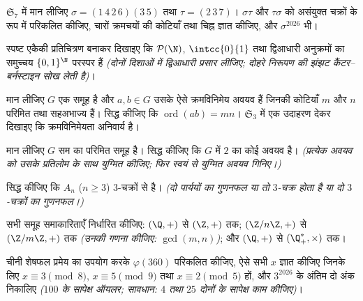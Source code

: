 \begin{exercise}[$\star$]\label{exo:b2:structures:2}
$\mathfrak{S}_7$ में मान लीजिए $\sigma = (1\,4\,2\,6)(3\,5)$ तथा $\tau =
(2\,3\,7)$। $\sigma\tau$ और $\tau\sigma$ को असंयुक्त चक्रों के रूप
में परिकलित कीजिए, चारों क्रमचयों की कोटियाँ तथा चिह्न ज्ञात कीजिए, और
$\sigma^{2026}$ भी।
\end{exercise}

\begin{exercise}[$\star$]\label{exo:b2:structures:3}
स्पष्ट एकैकी प्रतिचित्रण बनाकर दिखाइए कि $\mathcal{P}(\N)$, $\intcc{0}{1}$ तथा द्विआधारी
अनुक्रमों का समुच्चय $\{0,1\}^{\N}$ परस्पर  हैं \emph{(दोनों दिशाओं में
द्विआधारी प्रसार लीजिए; दोहरे निरूपण की झंझट कैंटर--बर्नस्टाइन सोख
लेती है)}।
\end{exercise}

\begin{exercise}[$\star$]\label{exo:b2:structures:4}
मान लीजिए $G$ एक समूह है और $a, b \in G$ उसके ऐसे क्रमविनिमेय अवयव हैं जिनकी
कोटियाँ $m$ और $n$ परिमित तथा सहअभाज्य हैं। सिद्ध कीजिए कि $\operatorname{ord}(ab) =
mn$। $\mathfrak{S}_3$
में एक उदाहरण देकर दिखाइए कि क्रमविनिमेयता अनिवार्य है।
\end{exercise}

\begin{exercise}[$\star\star$]\label{exo:b2:structures:5}
मान लीजिए $G$ सम  का परिमित समूह है। सिद्ध कीजिए कि $G$ में 
$2$ का कोई अवयव है। \emph{(प्रत्येक अवयव को उसके प्रतिलोम के साथ
युग्मित कीजिए; फिर स्वयं से युग्मित अवयव गिनिए।)}
\end{exercise}

\begin{exercise}[$\star\star$]\label{exo:b2:structures:6}
सिद्ध कीजिए कि $A_n$ ($n \geq 3$) $3$-चक्रों से  है। \emph{(दो पार्ययों का
गुणनफल या तो $3$-चक्र होता है या दो $3$-चक्रों का गुणनफल।)}
\end{exercise}

\begin{exercise}[$\star\star$]\label{exo:b2:structures:7}
सभी समूह समाकारिताएँ निर्धारित कीजिए: $(\Q, +)$ से $(\Z, +)$ तक; $(\Z/n\Z, +)$ से $(\Z/m\Z, +)$ तक
\emph{(उनकी गणना कीजिए: $\gcd(m,n)$)}; और $(\Q, +)$ से $(\Q_+^*, \times)$ तक।
\end{exercise}

\begin{exercise}[$\star\star$]\label{exo:b2:structures:8}
चीनी शेषफल प्रमेय का उपयोग करके $\varphi(360)$ परिकलित कीजिए, ऐसे सभी $x$ ज्ञात
कीजिए जिनके लिए $x \equiv 3 \pmod 8$, $x \equiv 5 \pmod 9$ तथा $x
\equiv 2 \pmod 5$ हों, और $3^{2026}$ के अंतिम दो अंक निकालिए
\emph{($100$ के सापेक्ष ऑयलर; सावधान: $4$ तथा $25$ दोनों के सापेक्ष काम
कीजिए)}।
\end{exercise}

